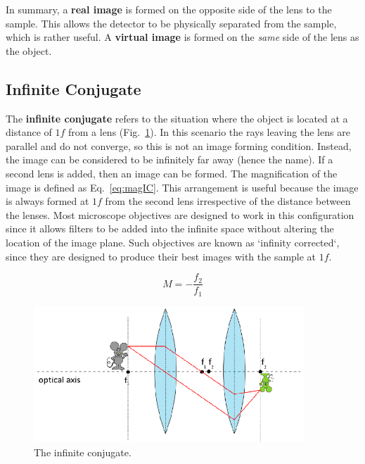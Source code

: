 \documentclass[a4paper]{report}
\begin{document}
In summary, a \textbf{real image} is formed on the opposite side of the lens to the sample. 
This allows the detector to be physically separated from the sample, which is rather useful.
A \textbf{virtual image} is formed on the \textit{same} side of the lens as the object. 

\clearpage

\subsection{Infinite Conjugate}
The \textbf{infinite conjugate} refers to the situation where the object is located at a distance of $1f$ from a lens (Fig.~\ref{infiniteConjugate}). 
In this scenario the rays leaving the lens are parallel and do not converge, so this is not an image forming condition. 
Instead, the image can be considered to be infinitely far away (hence the name). 
If a second lens is added, then an image can be formed. 
The magnification of the image is defined as Eq.~\ref{eq:magIC}. 
This arrangement is useful because the image is always formed at $1f$ from the second lens irrespective of the distance between the lenses.
Most microscope objectives are designed to work in this configuration since it allows filters to be added into the infinite space without altering the location of the image plane. 
Such objectives are known as `infinity corrected`, since they are designed to produce their best images with the sample at $1f$.

\begin{equation}
M=-\frac{f_2}{f_1}
\label{eq:magIC}
\end{equation}

\begin{figure}[h]
\center
\includegraphics[width=4in]{infiniteConjugate.eps}
\caption{The infinite conjugate.}
\label{infiniteConjugate}
\end{figure}
\end{document}
